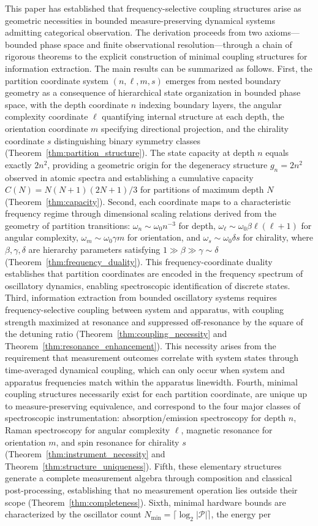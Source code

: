 \documentclass[twocolumn,10pt,a4paper]{article}
\theoremstyle{remark}
\newcommand{\partition}{\mathcal{P}}
\begin{document}
This paper has established that frequency-selective coupling structures arise as geometric necessities in bounded measure-preserving dynamical systems admitting categorical observation. The derivation proceeds from two axioms—bounded phase space and finite observational resolution—through a chain of rigorous theorems to the explicit construction of minimal coupling structures for information extraction. The main results can be summarized as follows. First, the partition coordinate system $(n, \ell, m, s)$ emerges from nested boundary geometry as a consequence of hierarchical state organization in bounded phase space, with the depth coordinate $n$ indexing boundary layers, the angular complexity coordinate $\ell$ quantifying internal structure at each depth, the orientation coordinate $m$ specifying directional projection, and the chirality coordinate $s$ distinguishing binary symmetry classes (Theorem~\ref{thm:partition_structure}). The state capacity at depth $n$ equals exactly $2n^2$, providing a geometric origin for the degeneracy structure $g_n = 2n^2$ observed in atomic spectra and establishing a cumulative capacity $C(N) = N(N+1)(2N+1)/3$ for partitions of maximum depth $N$ (Theorem~\ref{thm:capacity}). Second, each coordinate maps to a characteristic frequency regime through dimensional scaling relations derived from the geometry of partition transitions: $\omega_n \sim \omega_0 n^{-3}$ for depth, $\omega_\ell \sim \omega_0 \beta \ell(\ell+1)$ for angular complexity, $\omega_m \sim \omega_0 \gamma m$ for orientation, and $\omega_s \sim \omega_0 \delta s$ for chirality, where $\beta, \gamma, \delta$ are hierarchy parameters satisfying $1 \gg \beta \gg \gamma \sim \delta$ (Theorem~\ref{thm:frequency_duality}). This frequency-coordinate duality establishes that partition coordinates are encoded in the frequency spectrum of oscillatory dynamics, enabling spectroscopic identification of discrete states. Third, information extraction from bounded oscillatory systems requires frequency-selective coupling between system and apparatus, with coupling strength maximized at resonance and suppressed off-resonance by the square of the detuning ratio (Theorem~\ref{thm:coupling_necessity} and Theorem~\ref{thm:resonance_enhancement}). This necessity arises from the requirement that measurement outcomes correlate with system states through time-averaged dynamical coupling, which can only occur when system and apparatus frequencies match within the apparatus linewidth. Fourth, minimal coupling structures necessarily exist for each partition coordinate, are unique up to measure-preserving equivalence, and correspond to the four major classes of spectroscopic instrumentation: absorption/emission spectroscopy for depth $n$, Raman spectroscopy for angular complexity $\ell$, magnetic resonance for orientation $m$, and spin resonance for chirality $s$ (Theorem~\ref{thm:instrument_necessity} and Theorem~\ref{thm:structure_uniqueness}). Fifth, these elementary structures generate a complete measurement algebra through composition and classical post-processing, establishing that no measurement operation lies outside their scope (Theorem~\ref{thm:completeness}). Sixth, minimal hardware bounds are characterized by the oscillator count $N_{\min} = \lceil \log_2 |\partition| \rceil$, the energy per 
\end{document}
